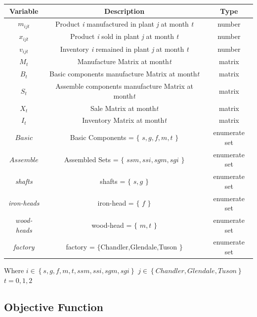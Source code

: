 \documentclass[12pt]{article}
\begin{document}
\begin{center}
\begin{tabular}{ c  c  c}
\hline
\textbf{Variable} & \textbf{Description} & \textbf{Type}\\
\hline
\textit{$m_{ijt}$} & Product \textit{i} manufactured in plant \textit{j} at month \textit{t} & number\\
\textit{$x_{ijt}$} & Product \textit{i} sold in plant \textit{j} at month \textit{t} & number\\
\textit{$v_{ijt}$} & Inventory \textit{i} remained in plant \textit{j} at month \textit{t} & number\\
\textit{$M_t$} & Manufacture Matrix at month\textit{t} & matrix\\
\textit{$B_t$} & Basic components manufacture Matrix at month\textit{t} & matrix\\
\textit{$S_t$} & Assemble components manufacture Matrix at month\textit{t} & matrix\\
\textit{$X_t$} & Sale Matrix at month\textit{t} & matrix\\
\textit{$I_t$} & Inventory Matrix at month\textit{t} & matrix\\
\textit{$Basic$} & Basic Components = $\{$
        $s,g,f,m,t$
    $\}$ 
    &enumerate set\\
\textit{$Assemble$} & Assembled Sets = $\{$
        $ssm,ssi,sgm,sgi$
    $\}$ 
    &enumerate set\\
\textit{shafts} & shafts = $\{$
        $s,g$
    $\}$ 
    &enumerate set\\
\textit{iron-heads} & iron-head = $\{$
        $f$
    $\}$ 
    &enumerate set\\
\textit{wood-heads} & wood-head = $\{$
        $m,t$
    $\}$ 
    &enumerate set\\
\textit{factory} & factory = $\{
        $Chandler,Glendale,Tuson
    $\}$ 
    &enumerate set\\
\hline
\end{tabular}
\vspace{5mm}
\end{center}
Where
$i\in
    \left\{
        s,g,f,m,t,ssm,ssi,sgm,sgi
    \right\}$
\noindent
$j\in
    \left\{
        Chandler,Glendale,Tuson
    \right\}$
$t=0,1,2$

\noindent

\subsection{Objective Function}
\end{document}
